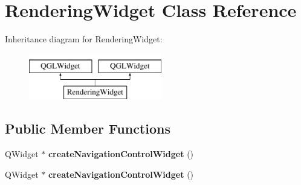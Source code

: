 \hypertarget{class_rendering_widget}{}\section{Rendering\+Widget Class Reference}
\label{class_rendering_widget}
Inheritance diagram for Rendering\+Widget\+:\begin{figure}[H]
\begin{center}
\leavevmode
\includegraphics[height=2.000000cm]{class_rendering_widget}
\end{center}
\end{figure}
\subsection*{Public Member Functions}
\begin{DoxyCompactItemize}
\item 
\mbox{\label{class_rendering_widget_a317176ced555c065cd0e818046db1f9d}} 
Q\+Widget $\ast$ {\bfseries create\+Navigation\+Control\+Widget} ()
\item 
\mbox{\label{class_rendering_widget_af42772c571b07fb695e7210d68ad660c}} 
Q\+Widget $\ast$ {\bfseries create\+Navigation\+Control\+Widget} ()
\end{DoxyCompactItemize}
